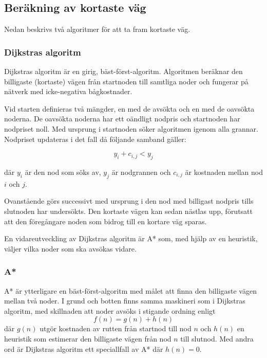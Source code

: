 \documentclass[11pt]{article}
\begin{document}
\begin{flushleft}
\subsection{Beräkning av kortaste väg}
Nedan beskrivs två algoritmer för att ta fram kortaste väg.

\subsubsection{Dijkstras algoritm}
Dijkstras algoritm är en girig, bäst-först-algoritm. Algoritmen beräknar den billigaste (kortaste) vägen från startnoden till samtliga noder och fungerar på nätverk med icke-negativa bågkostnader. 

Vid starten definieras två mängder, en med de avsökta och en med de oavsökta noderna. De oavsökta noderna har ett oändligt nodpris och startnoden har nodpriset noll. Med ursprung i startnoden söker algoritmen igenom alla grannar. Nodpriset updateras i det fall då följande samband gäller:

\begin{displaymath}
	y_i + c_{i,j} < y_j
\end{displaymath}

där \begin{math} y_i \end{math} är den nod som söks av, \begin{math} y_j \end{math} är nodgrannen och \begin{math} c_{i,j} \end{math} är kostnaden mellan nod \begin{math} i \end{math} och \begin{math} j \end{math}.

Ovanstående görs successivt med ursprung i den nod med billigast nodpris tills slutnoden har undersökts. Den kortaste vägen kan sedan nästlas upp, förutsatt att den föregångare noden som bidrog till en kortare väg sparas. 

En vidareutveckling av Dijkstras algoritm är A* som, med hjälp av en heuristik, väljer vilka noder som ska avsökas vidare.

\subsubsection{A*}
A* är ytterligare en bäst-först-algoritm med målet att finna den billigaste vägen mellan två noder. I grund och botten finns samma maskineri som i Dijkstras algoritm, med skillnaden att noder avsöks i stigande ordning enligt
\begin{equation*}
	f(n) = g(n) + h(n)
\end{equation*}
där $g(n)$ utgör kostnaden av rutten från startnod till nod $n$ och $h(n)$ en heuristik som estimerar den billigaste vägen från nod $n$ till slutnod. Med andra ord är Dijkstras algoritm ett speciallfall av A* där $h(n) = 0$.


\end{flushleft}
\end{document}
